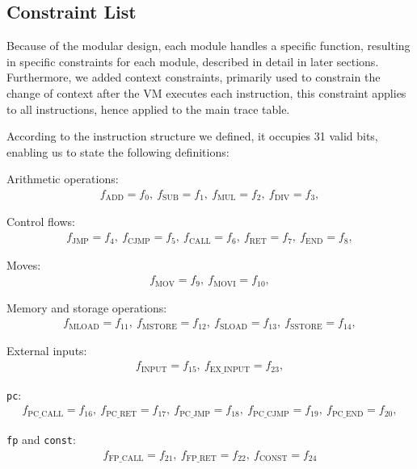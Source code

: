 \subsection{Constraint List}

Because of the modular design, each module handles a specific function, resulting in specific constraints for each module, described in detail in later sections. Furthermore, we added context constraints, primarily used to constrain the change of context after the VM executes each instruction, this constraint applies to all instructions, hence applied to the main trace table.

According to the instruction structure we defined, it occupies 31 valid bits, enabling us to state the following definitions:

Arithmetic operations:
\begin{align*}
    f_\text{ADD} = f_{0},\ f_\text{SUB} = f_{1},\ f_\text{MUL} = f_{2},\ f_\text{DIV} = f_{3},
\end{align*}

Control flows:
\begin{align*}
    f_\text{JMP} = f_{4},\ f_\text{CJMP} = f_{5},\ f_\text{CALL} = f_{6},\ f_\text{RET} = f_{7},\ f_\text{END} = f_{8},
\end{align*}

Moves:
\begin{align*}
    f_\text{MOV} = f_{9},\ f_\text{MOVI} = f_{10},
\end{align*}

Memory and storage operations:
\begin{align*}
    f_\text{MLOAD} = f_{11},\ f_\text{MSTORE} = f_{12},\ f_\text{SLOAD} = f_{13},\ f_\text{SSTORE} = f_{14},
\end{align*}

External inputs:
\begin{align*}
    f_\text{INPUT} = f_{15},\ f_\text{EX\_INPUT} = f_{23},
\end{align*}

\verb|pc|:
\begin{align*}
    f_\text{PC\_CALL} = f_{16},\ f_\text{PC\_RET} = f_{17},\ f_\text{PC\_JMP} = f_{18},\ f_\text{PC\_CJMP} = f_{19},\ f_\text{PC\_END} = f_{20},
\end{align*}

\verb|fp| and \verb|const|:
\begin{align*}
    f_\text{FP\_CALL} = f_{21},\ f_\text{FP\_RET} = f_{22},\ f_\text{CONST} = f_{24}
\end{align*}

